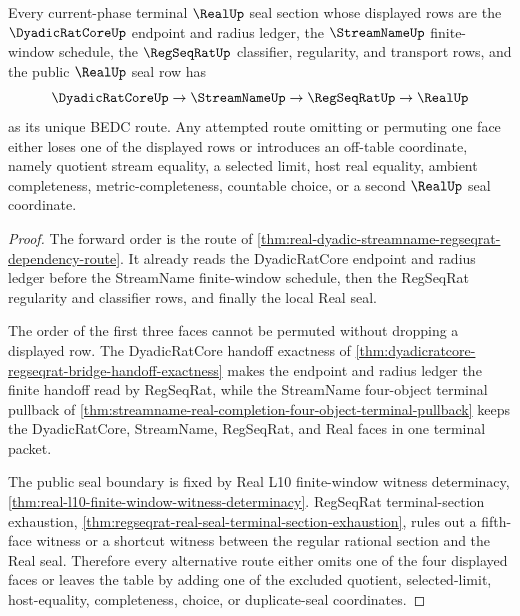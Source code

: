 \begin{theorem}
\label{thm:real-l10-four-face-route-order-uniqueness}
Every current-phase terminal $\RealUp$ seal section whose displayed rows are the $\DyadicRatCoreUp$ endpoint and radius ledger, the $\StreamNameUp$ finite-window schedule, the $\RegSeqRatUp$ classifier, regularity, and transport rows, and the public $\RealUp$ seal row has
$$
\DyadicRatCoreUp \to \StreamNameUp \to \RegSeqRatUp \to \RealUp
$$
as its unique BEDC route. Any attempted route omitting or permuting one face either loses one of the displayed rows or introduces an off-table coordinate, namely quotient stream equality, a selected limit, host real equality, ambient completeness, metric-completeness, countable choice, or a second $\RealUp$ seal coordinate.
\end{theorem}
\begin{proof}
The forward order is the route of \autoref{thm:real-dyadic-streamname-regseqrat-dependency-route}. It already reads the DyadicRatCore endpoint and radius ledger before the StreamName finite-window schedule, then the RegSeqRat regularity and classifier rows, and finally the local Real seal.

The order of the first three faces cannot be permuted without dropping a displayed row. The DyadicRatCore handoff exactness of \autoref{thm:dyadicratcore-regseqrat-bridge-handoff-exactness} makes the endpoint and radius ledger the finite handoff read by RegSeqRat, while the StreamName four-object terminal pullback of \autoref{thm:streamname-real-completion-four-object-terminal-pullback} keeps the DyadicRatCore, StreamName, RegSeqRat, and Real faces in one terminal packet.

The public seal boundary is fixed by Real L10 finite-window witness determinacy, \autoref{thm:real-l10-finite-window-witness-determinacy}. RegSeqRat terminal-section exhaustion, \autoref{thm:regseqrat-real-seal-terminal-section-exhaustion}, rules out a fifth-face witness or a shortcut witness between the regular rational section and the Real seal. Therefore every alternative route either omits one of the four displayed faces or leaves the table by adding one of the excluded quotient, selected-limit, host-equality, completeness, choice, or duplicate-seal coordinates.
\end{proof}


